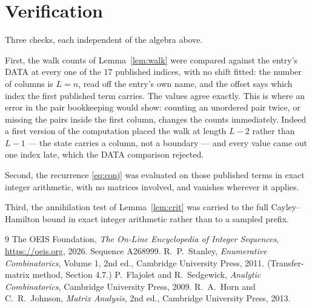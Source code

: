 \documentclass[11pt,a4paper]{article}
\theoremstyle{plain}
\theoremstyle{definition}
\begin{document}
\section{Verification}

Three checks, each independent of the algebra above.

First, the walk counts of Lemma~\ref{lem:walk} were compared against the entry's DATA at
every one of the $17$ published indices, with no shift fitted: the number of columns is
$L=n$, read off the entry's own name, and the offset says which index the first
published term carries. The values agree exactly. This is where an error in the pair
bookkeeping would show: counting an unordered pair twice, or missing the pairs inside the
first column, changes the counts immediately. Indeed a first version of the computation
placed the walk at length $L-2$ rather than $L-1$ --- the state carries a column, not a
boundary --- and every value came out one index late, which the DATA comparison rejected.

Second, the recurrence \eqref{eq:conj} was evaluated on those published terms in exact
integer arithmetic, with no matrices involved, and vanishes wherever it applies.

Third, the annihilation test of Lemma~\ref{lem:crit} was carried to the full
Cayley--Hamilton bound in exact integer arithmetic rather than to a sampled prefix.

\begin{thebibliography}{9}
 The OEIS Foundation, \emph{The On-Line Encyclopedia of Integer
Sequences}, \url{https://oeis.org}, 2026. Sequence A268999.
 R.~P.~Stanley, \emph{Enumerative Combinatorics}, Volume 1, 2nd ed.,
Cambridge University Press, 2011. (Transfer-matrix method, Section 4.7.)
 P.~Flajolet and R.~Sedgewick, \emph{Analytic Combinatorics}, Cambridge
University Press, 2009.
 R.~A.~Horn and C.~R.~Johnson, \emph{Matrix Analysis}, 2nd ed., Cambridge
University Press, 2013.
\end{thebibliography}
\end{document}
